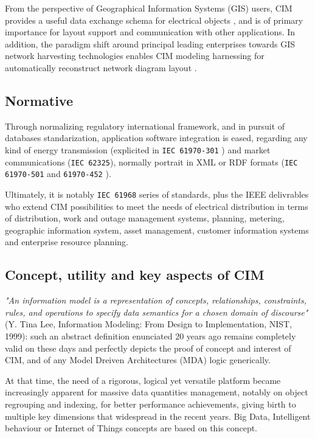 From the perspective of Geographical Information Systems (GIS) users, CIM provides a useful data exchange schema for electrical objects \cite{CIMIntelliGrid}, and is of primary importance for layout support and communication with other applications. In addition, the paradigm shift around principal leading enterprises towards GIS network harvesting technologies enables CIM modeling harnessing for automatically reconstruct network diagram layout \cite{CIM-GIS}.

\subsection{Normative}

Through normalizing regulatory international framework, and in pursuit of databases standarization, application software integration is eased,  regarding any kind of energy transmission (explicited in \texttt{IEC 61970-301} \cite{IEC-2003}) and market communications (\texttt{IEC 62325}), normally portrait in  XML or RDF formats (\texttt{IEC 61970-501} \cite{IEC_xml-rdf} and \texttt{61970-452} \cite{IEC_CIM_static}).  

Ultimately, it is notably \texttt{IEC 61968} \cite{IEC-application} series of standards, plus the IEEE delivrables \cite{CIMIEE,CIMIntelliGrid} who extend CIM possibilities to meet the needs of electrical distribution in terms of distribution, work and outage management systems, planning, metering, geographic information system, asset management, customer information systems and enterprise resource planning. 

\subsection{Concept, utility and key aspects of CIM}

\textit{"An information model is a representation of concepts, relationships, constraints, rules, and operations to specify data semantics for a chosen domain of discourse"} (Y. Tina Lee, Information Modeling: From Design to Implementation, NIST, 1999): such an abstract definition enunciated 20 years ago remains completely valid on these days and perfectly depicts the proof of concept and interest of CIM, and of any Model Dreiven Architectures (MDA) logic generically. 

At that time, the need of a rigorous, logical yet versatile platform became increasingly apparent for massive data quantities management, notably on object regrouping and indexing, for better performance achievements, giving birth to multiple key dimensions that widespread in the recent years. Big Data, Intelligent behaviour or Internet of Things concepts are based on this concept.

